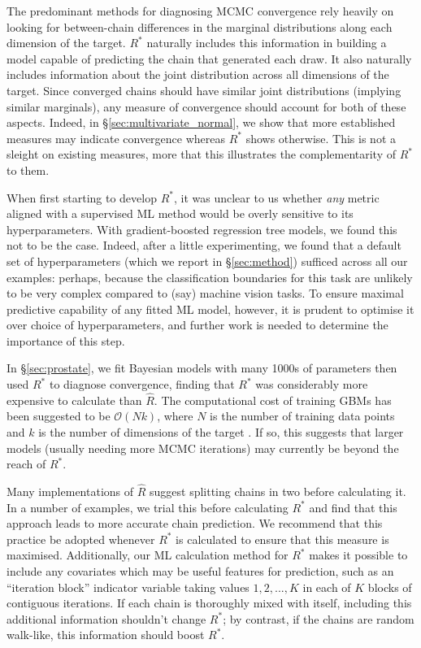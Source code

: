 \documentclass{article}
\begin{document}
The predominant methods for diagnosing MCMC convergence rely heavily on looking for between-chain differences in the marginal distributions along each dimension of the target. $R^*$ naturally includes this information in building a model capable of predicting the chain that generated each draw. It also naturally includes information about the joint distribution across all dimensions of the target. Since converged chains should have similar joint distributions (implying similar marginals), any measure of convergence should account for both of these aspects. Indeed, in \S\ref{sec:multivariate_normal}, we show that more established measures may indicate convergence whereas $R^*$ shows otherwise. This is not a sleight on existing measures, more that this illustrates the complementarity of $R^*$ to them.

When first starting to develop $R^*$, it was unclear to us whether \textit{any} metric aligned with a supervised ML method would be overly sensitive to its hyperparameters. With gradient-boosted regression tree models, we found this not to be the case. Indeed, after a little experimenting, we found that a default set of hyperparameters (which we report in \S\ref{sec:method}) sufficed across all our examples: perhaps, because the classification boundaries for this task are unlikely to be very complex compared to (say) machine vision tasks. To ensure maximal predictive capability of any fitted ML model, however, it is prudent to optimise it over choice of hyperparameters, and further work is needed to determine the importance of this step.

In \S\ref{sec:prostate}, we fit Bayesian models with many 1000s of parameters then used $R^*$ to diagnose convergence, finding that $R^*$ was considerably more expensive to calculate than $\widehat{R}$. The computational cost of training GBMs has been suggested to be $\mathcal{O}(N k)$, where $N$ is the number of training data points and $k$ is the number of dimensions of the target \citep{complexity2018}. If so, this suggests that larger models (usually needing more MCMC iterations) may currently be beyond the reach of $R^*$.

Many implementations of $\widehat{R}$ suggest splitting chains in two before calculating it. In a number of examples, we trial this before calculating $R^*$ and find that this approach leads to more accurate chain prediction. We recommend that this practice be adopted whenever $R^*$ is calculated to ensure that this measure is maximised. Additionally, our ML calculation method for $R^*$ makes it possible to include any covariates which may be useful features for prediction, such as an ``iteration block'' indicator variable taking values $1, 2, ..., K$ in each of $K$ blocks of contiguous iterations. If each chain is thoroughly mixed with itself, including this additional information shouldn't change $R^*$; by contrast, if the chains are random walk-like, this information should boost $R^*$.
\end{document}
